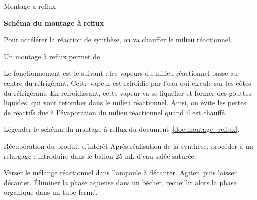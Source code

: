 \begin{doc}{Montage à reflux}
  \label{doc:montage_reflux}
  \vspace*{-24pt}
  \begin{encart}
    \begin{center}
      
      \vspace*{-8pt}
      \textbf{\small{Schéma du montage à reflux}}
    \end{center}
  \end{encart}
  Pour accélérer la réaction de synthèse, on va chauffer le milieu réactionnel.
  
  Un montage à reflux permet de 
  
  Le fonctionnement est le suivant : les vapeurs du milieu réactionnel passe au centre du réfrigérant.
  Cette vapeur est refroidie par l'eau qui circule sur les côtés du réfrigérant.
  En refroidissant, cette vapeur va se liquéfier et former des gouttes liquides, qui vont retomber dans le milieu réactionnel.
  Ainsi, on évite les pertes de réactifs due à l'évaporation du milieu réactionnel quand il est chauffé.
\end{doc}

\numeroQuestion Légender le schéma du montage à reflux du document~\ref{doc:montage_reflux}.



\begin{doc}{Récupération du produit d'intérêt}
  \label{doc:decantation_synthese_banane}
  Après réalisation de la synthèse, procéder à un relargage : introduire dans le ballon 25 mL d'eau salée saturée.
  \vspace*{-8pt}
  \begin{center}
  \end{center}
  \vspace*{-16pt}
  Verser le mélange réactionnel dans l'ampoule à décanter.
  Agiter, puis laisser décanter.
  Éliminer la phase aqueuse dans un bécher, recueillir alors la phase organique dans un tube fermé.
\end{doc}




